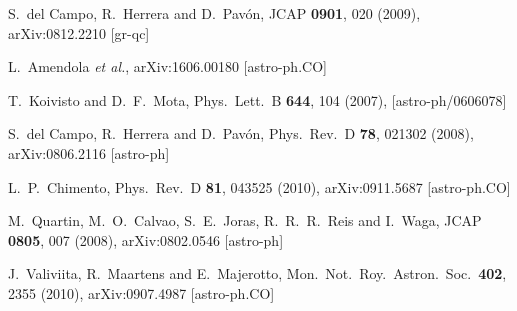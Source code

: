 \documentclass[superscriptaddress,oneolumn,secnumarabic,
amssymb,amsmath,nobibnotes,aps,prd,showpacs,nofootinbib]{revtex4}%
\begin{document}
\begin{thebibliography}{*}
S.~del Campo, R.~Herrera and D.~Pav\'on,
JCAP {\bf 0901}, 020 (2009),
arXiv:0812.2210 [gr-qc]

  L.~Amendola {\it et al.},
  arXiv:1606.00180 [astro-ph.CO]



  T.~Koivisto and D.~F.~Mota,
  Phys.\ Lett.\ B {\bf 644}, 104 (2007),
  [astro-ph/0606078]



S.~del Campo, R.~Herrera and D.~Pav\'on,
Phys.\ Rev.\ D {\bf 78}, 021302 (2008),
arXiv:0806.2116 [astro-ph]





L.~P.~Chimento,
Phys.\ Rev.\ D {\bf 81}, 043525 (2010),
arXiv:0911.5687 [astro-ph.CO]



M.~Quartin, M.~O.~Calvao, S.~E.~Joras, R.~R.~R.~Reis and I.~Waga,
JCAP {\bf 0805}, 007 (2008),
arXiv:0802.0546 [astro-ph]



J.~Valiviita, R.~Maartens and E.~Majerotto,
Mon.\ Not.\ Roy.\ Astron.\ Soc.\  {\bf 402}, 2355 (2010),
arXiv:0907.4987 [astro-ph.CO]




\end{thebibliography}
\end{document}
